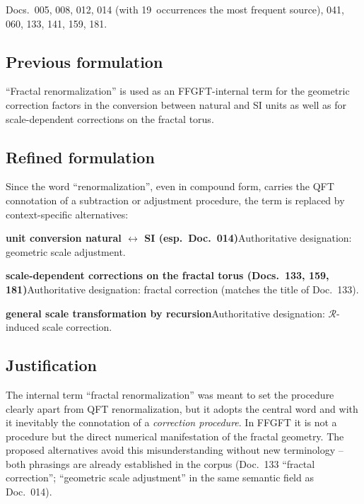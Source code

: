 Docs.~005, 008, 012, 014 (with 19~occurrences the most frequent source),
041, 060, 133, 141, 159, 181.

\subsection*{Previous formulation}

\enquote{Fractal renormalization} is used as an FFGFT-internal term for the
geometric correction factors in the conversion between natural and SI units as
well as for scale-dependent corrections on the fractal torus.

\subsection*{Refined formulation}

Since the word \enquote{renormalization}, even in compound form, carries the
QFT connotation of a subtraction or adjustment procedure, the term is replaced
by context-specific alternatives:

\smallskip\noindent \textbf{unit conversion natural $\leftrightarrow$ SI (esp.\ Doc.~014)}\quad Authoritative designation: geometric scale adjustment.

\smallskip\noindent \textbf{scale-dependent corrections on the fractal torus (Docs.~133, 159, 181)}\quad Authoritative designation: fractal correction (matches the title of Doc.~133).

\smallskip\noindent \textbf{general scale transformation by recursion}\quad Authoritative designation: $\mathcal{R}$-induced scale correction.

\medskip


\subsection*{Justification}

The internal term \enquote{fractal renormalization} was meant to set the
procedure clearly apart from QFT renormalization, but it adopts the central
word and with it inevitably the connotation of a \emph{correction procedure}.
In FFGFT it is not a procedure but the direct numerical manifestation of the
fractal geometry. The proposed alternatives avoid this misunderstanding
without new terminology -- both phrasings are already established in the corpus
(Doc.~133 \enquote{fractal correction}; \enquote{geometric scale adjustment}
in the same semantic field as Doc.~014).

